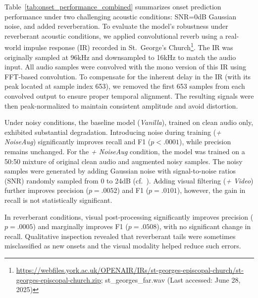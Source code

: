 \documentclass{article}
\begin{document}
Table~\ref{tab:onset_performance_combined} summarizes onset prediction performance under two challenging acoustic conditions: SNR=0\si{dB} Gaussian noise, and added reverberation. To evaluate the model's robustness under reverberant acoustic conditions, we applied convolutional reverb using a real-world impulse response (IR) recorded in St.~George's Church\footnote{\href{https://webfiles.york.ac.uk/OPENAIR/IRs/st-georges-episcopal-church/st-georges-episcopal-church.zip}{https://webfiles.york.ac.uk/OPENAIR/IRs/st-georges-episcopal-church/st-georges-episcopal-church.zip}; st\_georges\_far.wav (Last accessed: June 28, 2025)}. The IR was originally sampled at 96\si{kHz} and downsampled to 16\si{kHz} to match the audio input. All audio samples were convolved with the mono version of this IR using FFT-based convolution. To compensate for the inherent delay in the IR (with its peak located at sample index 653), we removed the first 653 samples from each convolved output to ensure proper temporal alignment. The resulting signals were then peak-normalized to maintain consistent amplitude and avoid distortion.


Under noisy conditions, the baseline model (\textit{Vanilla}), trained on clean audio only, exhibited substantial degradation. Introducing noise during training (\textit{+ NoiseAug}) significantly improves recall and F1 ($p < .0001$), while precision remains unchanged. For the \textit{+ NoiseAug} condition, the model was trained on a 50:50 mixture of original clean audio and augmented noisy samples. The noisy samples were generated by adding Gaussian noise with signal-to-noise ratios (SNR) randomly sampled from 0 to 24\si{dB} (cf.~\cite{ISMIR24Kim}). Adding visual filtering (\textit{+ Video}) further improves precision ($p = .0052$) and F1 ($p = .0101$), however, the gain in recall is not statistically significant.

In reverberant conditions, visual post-processing significantly improves precision ($p = .0005$) and marginally improves F1 ($p = .0508$), with no significant change in recall. Qualitative inspection revealed that reverberant tails were sometimes misclassified as new onsets and the visual modality helped reduce such errors.

 
\end{document}
